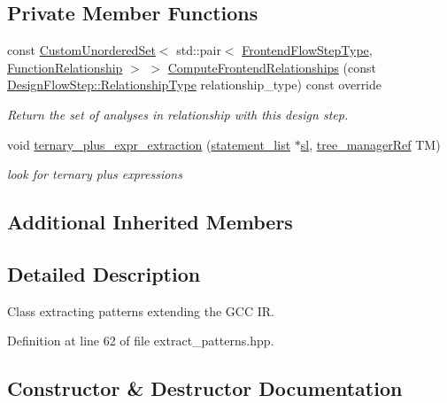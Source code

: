 \subsection*{Private Member Functions}
\begin{DoxyCompactItemize}
\item 
const \hyperlink{classCustomUnorderedSet}{Custom\+Unordered\+Set}$<$ std\+::pair$<$ \hyperlink{frontend__flow__step_8hpp_afeb3716c693d2b2e4ed3e6d04c3b63bb}{Frontend\+Flow\+Step\+Type}, \hyperlink{classFrontendFlowStep_af7cf30f2023e5b99e637dc2058289ab0}{Function\+Relationship} $>$ $>$ \hyperlink{classextract__patterns_aab3d5e503044febc2718e02322cb01ef}{Compute\+Frontend\+Relationships} (const \hyperlink{classDesignFlowStep_a723a3baf19ff2ceb77bc13e099d0b1b7}{Design\+Flow\+Step\+::\+Relationship\+Type} relationship\+\_\+type) const override
\begin{DoxyCompactList}\small\item\em Return the set of analyses in relationship with this design step. \end{DoxyCompactList}\item 
void \hyperlink{classextract__patterns_aa8360e2e8d2a377b8d0938d9c50c6771}{ternary\+\_\+plus\+\_\+expr\+\_\+extraction} (\hyperlink{structstatement__list}{statement\+\_\+list} $\ast$\hyperlink{tutorial__pnnl__2019_2optimizations_2second_2solution_2adpcm_8c_ace9c0991f7fffe6ab436175d7fff821e}{sl}, \hyperlink{tree__manager_8hpp_a96ff150c071ce11a9a7a1e40590f205e}{tree\+\_\+manager\+Ref} TM)
\begin{DoxyCompactList}\small\item\em look for ternary plus expressions \end{DoxyCompactList}\end{DoxyCompactItemize}
\subsection*{Additional Inherited Members}


\subsection{Detailed Description}
Class extracting patterns extending the G\+CC IR. 

Definition at line 62 of file extract\+\_\+patterns.\+hpp.



\subsection{Constructor \& Destructor Documentation}
\mbox{\label{classextract__patterns_a87135feeaeca7d244b0cdaf91a4a079c}} 
